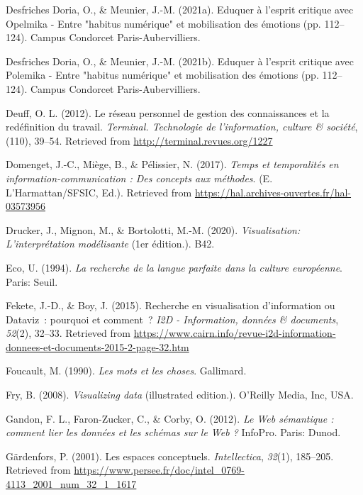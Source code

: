 \documentclass[
  a4paper,
  DIV=11,
  numbers=noendperiod]{scrreprt}
\newlength{\cslhangindent}
\newenvironment{CSLReferences}[2] %
 {\begin{list}{}{%
  \setlength{\itemindent}{0pt}
  \setlength{\leftmargin}{0pt}
  \setlength{\parsep}{0pt}
  \ifodd #1
   \setlength{\leftmargin}{\cslhangindent}
   \setlength{\itemindent}{-1\cslhangindent}
  \fi
  \setlength{\itemsep}{#2\baselineskip}}}
 {\end{list}}
\begin{document}
\begin{CSLReferences}{1}{0}
Desfriches Doria, O., \& Meunier, J.-M. (2021a). Eduquer à l'esprit
critique avec Opelmika - Entre {"}habitus numérique{"} et mobilisation
des émotions (pp. 112--124). Campus Condorcet Paris-Aubervilliers.

Desfriches Doria, O., \& Meunier, J.-M. (2021b). Eduquer à l'esprit
critique avec Polemika - Entre {"}habitus numérique{"} et mobilisation
des émotions (pp. 112--124). Campus Condorcet Paris-Aubervilliers.

Deuff, O. L. (2012). Le réseau personnel de gestion des connaissances et
la redéfinition du travail. \emph{Terminal. Technologie de
l'information, culture \& société}, (110), 39--54. Retrieved from
\url{http://terminal.revues.org/1227}

Domenget, J.-C., Miège, B., \& Pélissier, N. (2017). \emph{Temps et
temporalités en information-communication : Des concepts aux méthodes}.
(E. L'Harmattan/SFSIC, Ed.). Retrieved from
\url{https://hal.archives-ouvertes.fr/hal-03573956}

Drucker, J., Mignon, M., \& Bortolotti, M.-M. (2020).
\emph{Visualisation: L'interprétation modélisante} (1er édition.). B42.

Eco, U. (1994). \emph{La recherche de la langue parfaite dans la culture
européenne}. Paris: Seuil.

Fekete, J.-D., \& Boy, J. (2015). Recherche en visualisation
d{'}information ou Dataviz~: pourquoi et comment~? \emph{I2D -
Information, données \& documents}, \emph{52}(2), 32--33. Retrieved from
\url{https://www.cairn.info/revue-i2d-information-donnees-et-documents-2015-2-page-32.htm}

Foucault, M. (1990). \emph{Les mots et les choses}. Gallimard.

Fry, B. (2008). \emph{Visualizing data} (illustrated edition.). O'Reilly
Media, Inc, USA.

Gandon, F. L., Faron-Zucker, C., \& Corby, O. (2012). \emph{Le Web
sémantique : comment lier les données et les schémas sur le Web ?}
InfoPro. Paris: Dunod.

Gärdenfors, P. (2001). Les espaces conceptuels. \emph{Intellectica},
\emph{32}(1), 185--205. Retrieved from
\url{https://www.persee.fr/doc/intel_0769-4113_2001_num_32_1_1617}


\end{CSLReferences}
\end{document}
